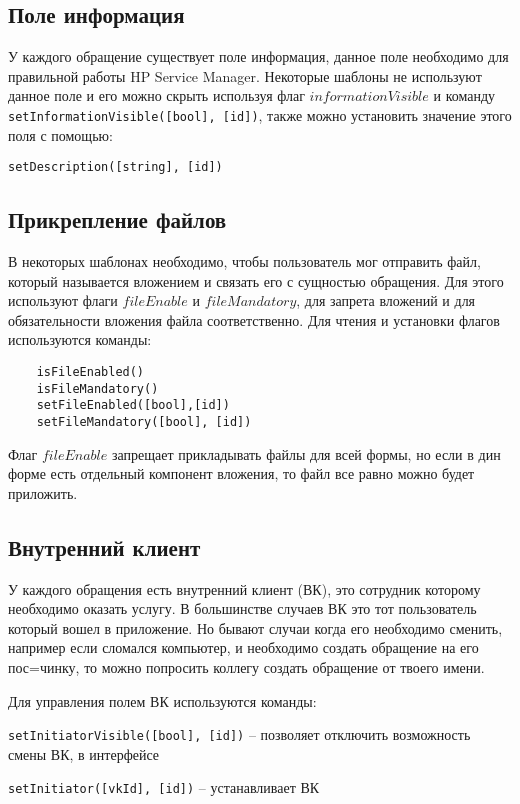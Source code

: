 \documentclass[../index.tex]{subfiles}
\begin{document}
\subsection{Поле информация}
У каждого обращение существует поле информация, данное поле необходимо для правильной работы HP Service Manager.
Некоторые шаблоны не используют данное поле и его можно скрыть используя флаг $informationVisible$ и команду
\verb|setInformationVisible([bool], [id])|, также можно установить значение этого поля с помощью:
\begin{verbatim}
setDescription([string], [id])
\end{verbatim}

\subsection{Прикрепление файлов}
В некоторых шаблонах необходимо, чтобы пользователь мог отправить файл, который называется вложением и связать его с сущностью обращения.
Для этого используют флаги $fileEnable$ и $fileMandatory$, для запрета вложений и для обязательности вложения файла соответственно.
Для чтения и установки флагов используются команды:
\begin{verbatim}
    isFileEnabled()
    isFileMandatory()
    setFileEnabled([bool],[id])
    setFileMandatory([bool], [id])
\end{verbatim}

Флаг $fileEnable$ запрещает прикладывать файлы для всей формы, но если в дин форме есть отдельный компонент вложения, то
файл все равно можно будет приложить.

\subsection{Внутренний клиент}

У каждого обращения есть внутренний клиент (ВК), это сотрудник которому необходимо оказать услугу. В большинстве случаев 
ВК это тот пользователь который вошел в приложение. Но бывают случаи когда его необходимо сменить, например если сломался компьютер,
и необходимо создать обращение на его пос=чинку, то можно попросить коллегу создать обращение от твоего имени.

Для управления полем ВК используются команды:

\verb|setInitiatorVisible([bool], [id])| -- позволяет отключить возможность смены ВК, в интерфейсе


\verb|setInitiator([vkId], [id])| -- устанавливает ВК
\end{document}
